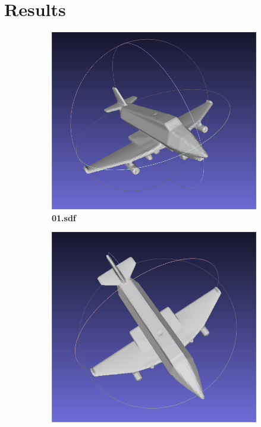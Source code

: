 \documentclass{ctexart}
\begin{document}
\section{Results}
\begin{figure}[htbp]
    \centering
    \begin{subfigure}[htbp]{0.3\linewidth}
        \centering
        \includegraphics[width=0.9\linewidth]{figures/1_1.png}
        \caption{\textbf{01.sdf}}
    \end{subfigure}
    \begin{subfigure}[htbp]{0.3\linewidth}
        \centering
        \includegraphics[width=0.9\linewidth]{figures/1_2.png}

\end{subfigure}
\end{figure}
\end{document}
